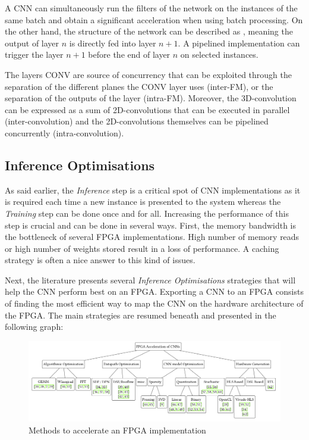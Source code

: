A CNN can simultaneously run the filters of the network on the instances of the same batch and obtain a significant acceleration when using batch processing. On the other hand, the structure of the network can be described as , meaning the output of layer $n$ is directly fed into layer $n+1$. A pipelined implementation can trigger the layer $n+1$ before the end of layer $n$ on selected instances.

The layers CONV are source of concurrency that can be exploited through the separation of the different planes the CONV layer uses (inter-FM), or the separation of the outputs of the layer (intra-FM). Moreover, the 3D-convolution can be expressed as a sum of 2D-convolutions that can be executed in parallel (inter-convolution) and the 2D-convolutions themselves can be pipelined concurrently (intra-convolution).


\subsection{Inference Optimisations}

As said earlier, the \emph{Inference} step is a critical spot of CNN implementations as it is required each time a new instance is presented to the system whereas the \emph{Training} step can be done once and for all. Increasing the performance of this step is crucial and can be done in several ways. First, the memory bandwidth is the bottleneck of several FPGA implementations. High number of memory reads or high number of weights stored result in a loss of performance. A caching strategy is often a nice answer to this kind of issues.

Next, the literature presents several \emph{Inference Optimisations} strategies that will help the CNN perform best on an FPGA. Exporting a CNN to an FPGA consists of finding the most efficient way to map the CNN on the hardware architecture of the FPGA. The main strategies are resumed beneath and presented in the following graph:

\begin{figure}[htbp]
	\centering
		\includegraphics[width=12cm]{Figures/InferenceOpt.png}
	\caption[Inference Optimisations]{Methods to accelerate an FPGA implementation \cite{Abdelouahab2018}}
	\label{fig:InferenceOpt}
\end{figure}

